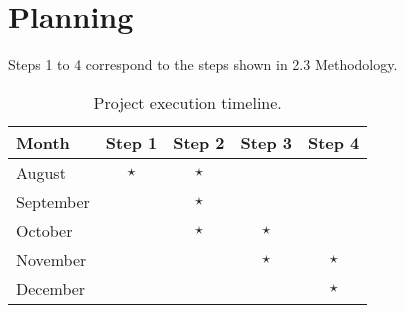 \section{Planning}

    Steps 1 to 4 correspond to the steps shown in 2.3 Methodology.

    \def\mark{$\star$}

    \begin{table}[h]
        \centering
        \begin{tabular}{|l|c|c|c|c|}
            \hline
            \textbf{Month} & \textbf{Step 1} & \textbf{Step 2} & \textbf{Step 3} & \textbf{Step 4} \\ \hline
            August & \mark & \mark & & \\ \hline
            September & & \mark & & \\ \hline
            October & & \mark & \mark & \\ \hline
            November & & & \mark & \mark \\ \hline
            December & & & & \mark \\ \hline
        \end{tabular}
        \caption{Project execution timeline.}
        \label{tab:timeline}
    \end{table}
